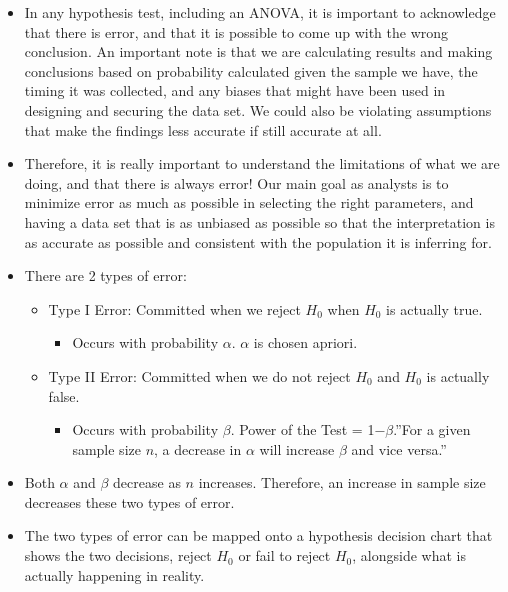 \documentclass[
  letterpaper,
  DIV=11,
  numbers=noendperiod]{scrreprt}
\providecommand{\tightlist}{%
  \setlength{\itemsep}{0pt}\setlength{\parskip}{0pt}}\usepackage{longtable,booktabs,array}
\begin{document}
\begin{itemize}
\item
  In any hypothesis test, including an ANOVA, it is important to
  acknowledge that there is error, and that it is possible to come up
  with the wrong conclusion. An important note is that we are
  calculating results and making conclusions based on probability
  calculated given the sample we have, the timing it was collected, and
  any biases that might have been used in designing and securing the
  data set. We could also be violating assumptions that make the
  findings less accurate if still accurate at all.\\
\item
  Therefore, it is really important to understand the limitations of
  what we are doing, and that there is always error! Our main goal as
  analysts is to minimize error as much as possible in selecting the
  right parameters, and having a data set that is as unbiased as
  possible so that the interpretation is as accurate as possible and
  consistent with the population it is inferring for.
\item
  There are 2 types of error:

  \begin{itemize}
  \tightlist
  \item
    Type I Error: Committed when we reject \(H_0\) when \(H_0\) is
    actually true.

    \begin{itemize}
    \tightlist
    \item
      Occurs with probability \(\alpha\). \(\alpha\) is chosen apriori.
    \end{itemize}
  \item
    Type II Error: Committed when we do not reject \(H_0\) and \(H_0\)
    is actually false.

    \begin{itemize}
    \tightlist
    \item
      Occurs with probability \(\beta\). Power of the Test =
      1−\(\beta\).''For a given sample size \(n\), a decrease in
      \(\alpha\) will increase \(\beta\) and vice versa.''
    \end{itemize}
  \end{itemize}
\item
  Both \(\alpha\) and \(\beta\) decrease as \(n\) increases. Therefore,
  an increase in sample size decreases these two types of error.
\item
  The two types of error can be mapped onto a hypothesis decision chart
  that shows the two decisions, reject \(H_0\) or fail to reject
  \(H_0\), alongside what is actually happening in reality.
\end{itemize}
\end{document}
